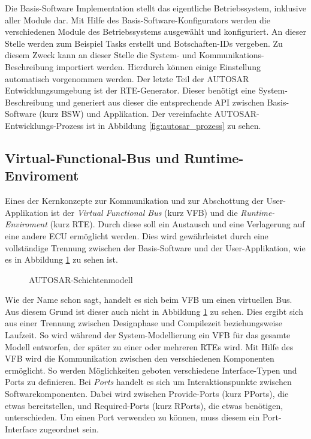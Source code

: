 \documentclass[
  a4paper,					    %
  twoside,
  DIV=calc,     				%
  bibliography=totoc,
  cleardoublepage=empty,
  ngerman,     					%
  final       					%
]{scrbook}
\begin{document}
Die Basis-Software Implementation stellt das eigentliche Betriebssystem, inklusive aller Module dar. Mit Hilfe des Basis-Software-Konfigurators werden die verschiedenen Module des Betriebssystems ausgewählt und konfiguriert. An dieser Stelle werden zum Beispiel Tasks erstellt und Botschaften-IDs vergeben. Zu diesem Zweck kann an dieser Stelle die System- und Kommunikations-Beschreibung importiert werden. Hierdurch können einige Einstellung automatisch vorgenommen werden. Der letzte Teil der AUTOSAR Entwicklungsumgebung ist der RTE-Generator. Dieser benötigt eine System-Beschreibung und generiert aus dieser die entsprechende API zwischen Basis-Software (kurz BSW) und Applikation. Der vereinfachte AUTOSAR-Entwicklungs-Prozess ist in Abbildung \ref{fig:autosar_prozess} zu sehen.



\subsection{Virtual-Functional-Bus und Runtime-Enviroment}
\label{sec:vfb}
Eines der Kernkonzepte zur Kommunikation und zur Abschottung der User-Applikation ist der \emph{Virtual Functional Bus} (kurz VFB) und die \emph{Runtime-Enviroment} (kurz RTE). Durch diese soll ein Austausch und eine Verlagerung auf eine andere ECU ermöglicht werden. Dies wird gewährleistet durch eine vollständige Trennung zwischen der Basis-Software und der User-Applikation, wie es in Abbildung \ref{fig:autosar_layer} zu sehen ist. 

\begin{figure}[ht]
    \centering
    \resizebox{\linewidth}{!}{}
    \caption{AUTOSAR-Schichtenmodell}
    \label{fig:autosar_layer}
\end{figure}

Wie der Name schon sagt, handelt es sich beim VFB um einen virtuellen Bus. Aus diesem Grund ist dieser auch nicht in Abbildung \ref{fig:autosar_layer} zu sehen. Dies ergibt sich aus einer Trennung zwischen Designphase und Compilezeit beziehungsweise Laufzeit. So wird während der System-Modellierung ein VFB für das gesamte Modell entworfen, der später zu einer oder mehreren RTEs wird. Mit Hilfe des VFB wird die Kommunikation zwischen den verschiedenen Komponenten ermöglicht. So werden Möglichkeiten geboten verschiedene Interface-Typen und Ports zu definieren. Bei \emph{Ports} handelt es sich um Interaktionspunkte zwischen Softwarekomponenten. Dabei wird zwischen Provide-Ports (kurz PPorts), die etwas bereitstellen, und Required-Ports (kurz RPorts), die etwas benötigen, unterschieden. Um einen Port verwenden zu können, muss diesem ein Port-Interface zugeordnet sein.
\end{document}
